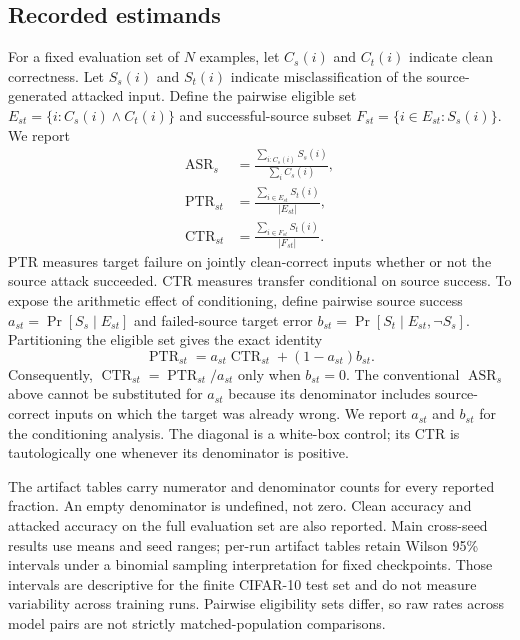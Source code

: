 \documentclass[10pt,twocolumn]{article}
\begin{document}
\subsection{Recorded estimands}
For a fixed evaluation set of $N$ examples, let $C_s(i)$ and $C_t(i)$ indicate clean correctness. Let $S_s(i)$ and $S_t(i)$ indicate misclassification of the source-generated attacked input. Define the pairwise eligible set $E_{st}=\{i:C_s(i)\land C_t(i)\}$ and successful-source subset $F_{st}=\{i\in E_{st}:S_s(i)\}$. We report
\begin{align}
\operatorname{ASR}_s &= \frac{\sum_{i:C_s(i)} S_s(i)}{\sum_i C_s(i)},\\
\operatorname{PTR}_{st} &= \frac{\sum_{i\in E_{st}} S_t(i)}{|E_{st}|},\\
\operatorname{CTR}_{st} &= \frac{\sum_{i\in F_{st}} S_t(i)}{|F_{st}|}.
\end{align}
PTR measures target failure on jointly clean-correct inputs whether or not the source attack succeeded. CTR measures transfer conditional on source success. To expose the arithmetic effect of conditioning, define pairwise source success $a_{st}=\Pr[S_s\mid E_{st}]$ and failed-source target error $b_{st}=\Pr[S_t\mid E_{st},\neg S_s]$. Partitioning the eligible set gives the exact identity
\begin{equation}
\operatorname{PTR}_{st}=a_{st}\operatorname{CTR}_{st}+(1-a_{st})b_{st}.
\end{equation}
Consequently, $\operatorname{CTR}_{st}=\operatorname{PTR}_{st}/a_{st}$ only when $b_{st}=0$. The conventional $\operatorname{ASR}_s$ above cannot be substituted for $a_{st}$ because its denominator includes source-correct inputs on which the target was already wrong. We report $a_{st}$ and $b_{st}$ for the conditioning analysis. The diagonal is a white-box control; its CTR is tautologically one whenever its denominator is positive.

The artifact tables carry numerator and denominator counts for every reported fraction. An empty denominator is undefined, not zero. Clean accuracy and attacked accuracy on the full evaluation set are also reported. Main cross-seed results use means and seed ranges; per-run artifact tables retain Wilson 95\% intervals under a binomial sampling interpretation for fixed checkpoints. Those intervals are descriptive for the finite CIFAR-10 test set and do not measure variability across training runs. Pairwise eligibility sets differ, so raw rates across model pairs are not strictly matched-population comparisons.
\end{document}

